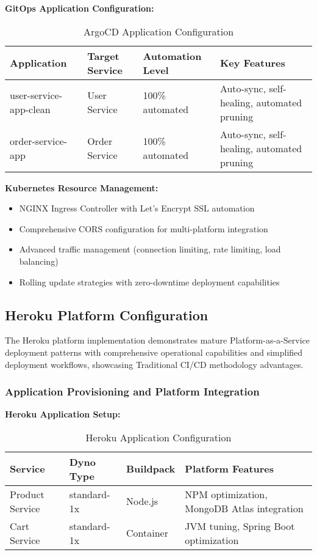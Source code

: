 \textbf{GitOps Application Configuration:}
\begin{table}[H]
\centering
\caption{ArgoCD Application Configuration}
\label{tab:argocd-applications}
\begin{tabular}{|p{3cm}|p{3cm}|p{4cm}|p{4cm}|}
\hline
\textbf{Application} & \textbf{Target Service} & \textbf{Automation Level} & \textbf{Key Features} \\
\hline
user-service-app-clean & User Service & 100\% automated & Auto-sync, self-healing, automated pruning \\
\hline
order-service-app & Order Service & 100\% automated & Auto-sync, self-healing, automated pruning \\
\hline
\end{tabular}
\end{table}

\textbf{Kubernetes Resource Management:}
\begin{itemize}
\item NGINX Ingress Controller with Let's Encrypt SSL automation
\item Comprehensive CORS configuration for multi-platform integration
\item Advanced traffic management (connection limiting, rate limiting, load balancing)
\item Rolling update strategies with zero-downtime deployment capabilities
\end{itemize}

\subsection{Heroku Platform Configuration}

The Heroku platform implementation demonstrates mature Platform-as-a-Service deployment patterns with comprehensive operational capabilities and simplified deployment workflows, showcasing Traditional CI/CD methodology advantages.

\subsubsection{Application Provisioning and Platform Integration}

\textbf{Heroku Application Setup:}
\begin{table}[H]
\centering
\caption{Heroku Application Configuration}
\label{tab:heroku-applications}
\begin{tabular}{|p{3cm}|p{2.5cm}|p{3cm}|p{4.5cm}|}
\hline
\textbf{Service} & \textbf{Dyno Type} & \textbf{Buildpack} & \textbf{Platform Features} \\
\hline
Product Service & standard-1x & Node.js & NPM optimization, MongoDB Atlas integration \\
\hline
Cart Service & standard-1x & Container & JVM tuning, Spring Boot optimization \\
\hline
\end{tabular}
\end{table}

